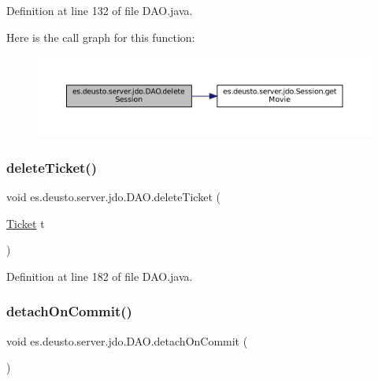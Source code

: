 Definition at line 132 of file D\+A\+O.\+java.

Here is the call graph for this function\+:
\nopagebreak
\begin{figure}[H]
\begin{center}
\leavevmode
\includegraphics[width=350pt]{classes_1_1deusto_1_1server_1_1jdo_1_1_d_a_o_aa4010f98d33fbdb583bb361ab576ff2d_cgraph}
\end{center}
\end{figure}
\mbox{\label{classes_1_1deusto_1_1server_1_1jdo_1_1_d_a_o_a174a90986e95dcae4ab728c8d1a16ca8}} 
\subsubsection{\texorpdfstring{deleteTicket()}{deleteTicket()}}
{\footnotesize\ttfamily void es.\+deusto.\+server.\+jdo.\+D\+A\+O.\+delete\+Ticket (\begin{DoxyParamCaption}\item[{\mbox{\hyperlink{classes_1_1deusto_1_1server_1_1jdo_1_1_ticket}{Ticket}}}]{t }\end{DoxyParamCaption})}



Definition at line 182 of file D\+A\+O.\+java.

\mbox{\label{classes_1_1deusto_1_1server_1_1jdo_1_1_d_a_o_afb5b546d4ade9c2cab1f769e0b0c82bf}} 
\subsubsection{\texorpdfstring{detachOnCommit()}{detachOnCommit()}}
{\footnotesize\ttfamily void es.\+deusto.\+server.\+jdo.\+D\+A\+O.\+detach\+On\+Commit (\begin{DoxyParamCaption}{ }\end{DoxyParamCaption})}



